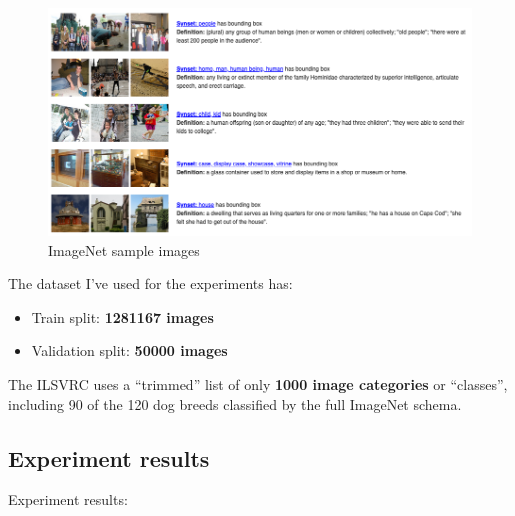 \begin{figure}[ht]
    \includegraphics[width=\textwidth]{images/results/imagenet.png}
    \centering
    \caption{ImageNet sample images}\label{fig:imagenet}
\end{figure}

The dataset I've used for the experiments has:

\begin{itemize}
    \item Train split: \textbf{1281167 images}
    \item Validation split: \textbf{50000 images}
\end{itemize}

The ILSVRC uses a ``trimmed'' list of only \textbf{1000 image categories} or
``classes'', including 90 of the 120 dog breeds classified by the full ImageNet
schema.

\subsection{Experiment results}
Experiment results: 

